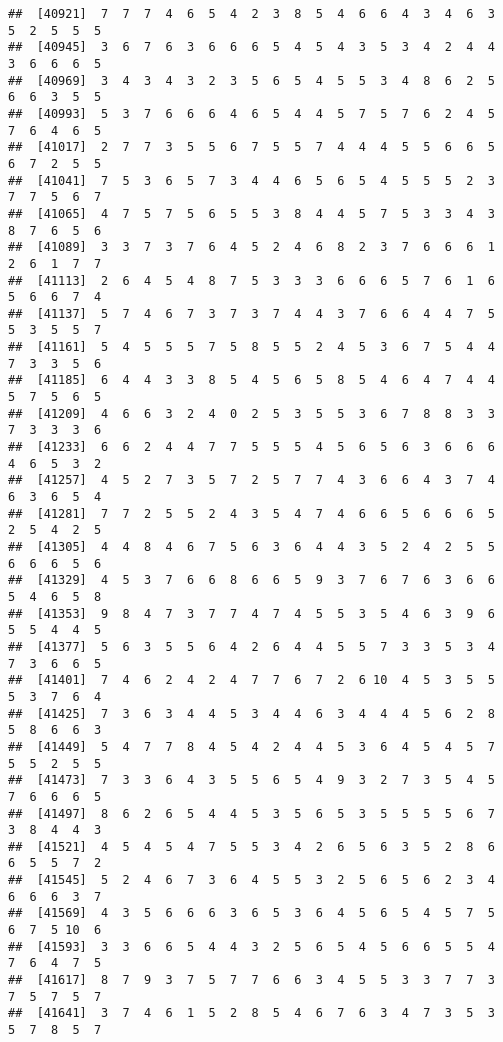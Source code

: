 \documentclass[
]{book}
\begin{document}
\begin{verbatim}
##  [40921]  7  7  7  4  6  5  4  2  3  8  5  4  6  6  4  3  4  6  3  5  2  5  5  5
##  [40945]  3  6  7  6  3  6  6  6  5  4  5  4  3  5  3  4  2  4  4  3  6  6  6  5
##  [40969]  3  4  3  4  3  2  3  5  6  5  4  5  5  3  4  8  6  2  5  6  6  3  5  5
##  [40993]  5  3  7  6  6  6  4  6  5  4  4  5  7  5  7  6  2  4  5  7  6  4  6  5
##  [41017]  2  7  7  3  5  5  6  7  5  5  7  4  4  4  5  5  6  6  5  6  7  2  5  5
##  [41041]  7  5  3  6  5  7  3  4  4  6  5  6  5  4  5  5  5  2  3  7  7  5  6  7
##  [41065]  4  7  5  7  5  6  5  5  3  8  4  4  5  7  5  3  3  4  3  8  7  6  5  6
##  [41089]  3  3  7  3  7  6  4  5  2  4  6  8  2  3  7  6  6  6  1  2  6  1  7  7
##  [41113]  2  6  4  5  4  8  7  5  3  3  3  6  6  6  5  7  6  1  6  5  6  6  7  4
##  [41137]  5  7  4  6  7  3  7  3  7  4  4  3  7  6  6  4  4  7  5  5  3  5  5  7
##  [41161]  5  4  5  5  5  7  5  8  5  5  2  4  5  3  6  7  5  4  4  7  3  3  5  6
##  [41185]  6  4  4  3  3  8  5  4  5  6  5  8  5  4  6  4  7  4  4  5  7  5  6  5
##  [41209]  4  6  6  3  2  4  0  2  5  3  5  5  3  6  7  8  8  3  3  7  3  3  3  6
##  [41233]  6  6  2  4  4  7  7  5  5  5  4  5  6  5  6  3  6  6  6  4  6  5  3  2
##  [41257]  4  5  2  7  3  5  7  2  5  7  7  4  3  6  6  4  3  7  4  6  3  6  5  4
##  [41281]  7  7  2  5  5  2  4  3  5  4  7  4  6  6  5  6  6  6  5  2  5  4  2  5
##  [41305]  4  4  8  4  6  7  5  6  3  6  4  4  3  5  2  4  2  5  5  6  6  6  5  6
##  [41329]  4  5  3  7  6  6  8  6  6  5  9  3  7  6  7  6  3  6  6  5  4  6  5  8
##  [41353]  9  8  4  7  3  7  7  4  7  4  5  5  3  5  4  6  3  9  6  5  5  4  4  5
##  [41377]  5  6  3  5  5  6  4  2  6  4  4  5  5  7  3  3  5  3  4  7  3  6  6  5
##  [41401]  7  4  6  2  4  2  4  7  7  6  7  2  6 10  4  5  3  5  5  5  3  7  6  4
##  [41425]  7  3  6  3  4  4  5  3  4  4  6  3  4  4  4  5  6  2  8  5  8  6  6  3
##  [41449]  5  4  7  7  8  4  5  4  2  4  4  5  3  6  4  5  4  5  7  5  5  2  5  5
##  [41473]  7  3  3  6  4  3  5  5  6  5  4  9  3  2  7  3  5  4  5  7  6  6  6  5
##  [41497]  8  6  2  6  5  4  4  5  3  5  6  5  3  5  5  5  5  6  7  3  8  4  4  3
##  [41521]  4  5  4  5  4  7  5  5  3  4  2  6  5  6  3  5  2  8  6  6  5  5  7  2
##  [41545]  5  2  4  6  7  3  6  4  5  5  3  2  5  6  5  6  2  3  4  6  6  6  3  7
##  [41569]  4  3  5  6  6  6  3  6  5  3  6  4  5  6  5  4  5  7  5  6  7  5 10  6
##  [41593]  3  3  6  6  5  4  4  3  2  5  6  5  4  5  6  6  5  5  4  7  6  4  7  5
##  [41617]  8  7  9  3  7  5  7  7  6  6  3  4  5  5  3  3  7  7  3  7  5  7  5  7
##  [41641]  3  7  4  6  1  5  2  8  5  4  6  7  6  3  4  7  3  5  3  5  7  8  5  7

\end{verbatim}
\end{document}
